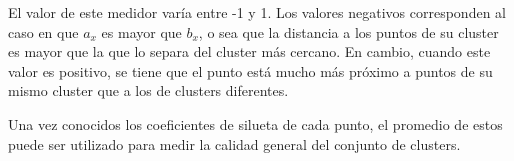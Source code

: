 El valor de este medidor varía entre -1 y 1.
Los valores negativos corresponden al caso en que $a_x$ es mayor que $b_x$, o sea que la distancia a los puntos de su cluster es mayor que la que lo separa del cluster más cercano.
En cambio, cuando este valor es positivo, se tiene que el punto está mucho más próximo a puntos de su mismo cluster que a los de clusters diferentes.

Una vez conocidos los coeficientes de silueta de cada punto, el promedio de estos puede ser utilizado para medir la calidad general del conjunto de clusters.

